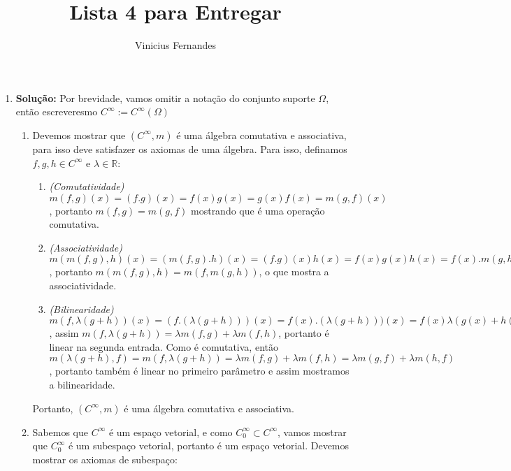 \documentclass{article}
\begin{document}
	
	\title{Lista 4 para Entregar}
	\author{Vinicius Fernandes}
	
	\maketitle
	
	\begin{enumerate}
		
		\item[3.] \textbf{Solução:} Por brevidade, vamos omitir a notação do conjunto suporte $\Omega$, então escreveresmo $C^{\infty} := C^{\infty}(\Omega)$
		\begin{enumerate}
			\item Devemos mostrar que $(C^{\infty}, m)$ é uma álgebra comutativa e associativa, para isso deve satisfazer os axiomas de uma álgebra. Para isso, definamos $f, g, h \in C^{\infty}$ e $\lambda \in \mathbb{R}$:
			
			\begin{enumerate}
				\item \textit{(Comutatividade)} $m(f, g)(x) = (f.g)(x) = f(x)g(x) = g(x)f(x) = m(g,f)(x)$, portanto $m(f,g) = m(g,f)$ mostrando que é uma operação comutativa. 
				
				\item \textit{(Associatividade)} $m(m(f,g), h)(x) = (m(f, g).h)(x) = (f.g)(x)h(x) = f(x)g(x)h(x) = f(x).m(g,h)(x) = m(f, m(g,h))(x)$, portanto $m(m(f,g), h)=m(f, m(g,h))$, o que mostra a associatividade.
				
				\item \textit{(Bilinearidade)} $m(f, \lambda(g + h))(x) = (f.( \lambda(g + h)))(x)  = f(x).( \lambda(g + h)))(x) = f(x) \lambda(g(x) + h(x)) = \lambda f(x) g(x) + \lambda  f(x)h(x) = \lambda m(f, g)(x) + \lambda m(f,h)(x)$, assim $m(f, \lambda(g + h)) = \lambda m(f,g) + \lambda m(f,h)$, portanto é linear na segunda entrada. Como é comutativa, então $m(\lambda(g + h), f) = m(f, \lambda(g + h)) = \lambda m(f,g) + \lambda m(f,h) = \lambda m(g,f) + \lambda m(h,f)$, portanto também é linear no primeiro parâmetro e assim mostramos a bilinearidade.
				
			\end{enumerate}
			Portanto, $(C^{\infty}, m)$ é uma álgebra comutativa e associativa. 
		
			\item Sabemos que $C^{\infty}$ é um espaço vetorial, e como $C^{\infty}_{0} \subset C^{\infty}$, vamos mostrar que $C^{\infty}_{0}$ é um subespaço vetorial, portanto é um espaço vetorial. Devemos mostrar os axiomas de subespaço:
			

\end{enumerate}
\end{enumerate}
\end{document}
